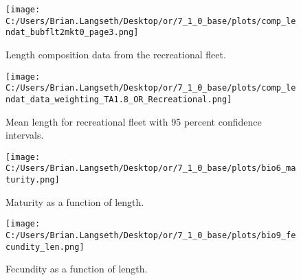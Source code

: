 \documentclass[11pt,
  english,
  a4paper,
]{article}
\begin{document}
\tagmcend\tagstructend


\begin{figure}
\centering
\texttt{[image: C:/Users/Brian.Langseth/Desktop/or/7\_1\_0\_base/plots/comp\_lendat\_bubflt2mkt0\_page3.png]}
\caption{Length composition data from the recreational fleet.\label{fig:rec-len-data}}
\end{figure}

\tagmcend\tagstructend


\begin{figure}
\centering
\texttt{[image: C:/Users/Brian.Langseth/Desktop/or/7\_1\_0\_base/plots/comp\_lendat\_data\_weighting\_TA1.8\_OR\_Recreational.png]}
\caption{Mean length for recreational fleet with 95 percent confidence intervals.\label{fig:mean-rec-len-data}}
\end{figure}

\tagmcend\tagstructend


\begin{figure}
\centering
\texttt{[image: C:/Users/Brian.Langseth/Desktop/or/7\_1\_0\_base/plots/bio6\_maturity.png]}
\caption{Maturity as a function of length.\label{fig:maturity}}
\end{figure}

\tagmcend\tagstructend


\begin{figure}
\centering
\texttt{[image: C:/Users/Brian.Langseth/Desktop/or/7\_1\_0\_base/plots/bio9\_fecundity\_len.png]}
\caption{Fecundity as a function of length.\label{fig:fecundity}}
\end{figure}

\tagmcend\tagstructend

\end{document}
